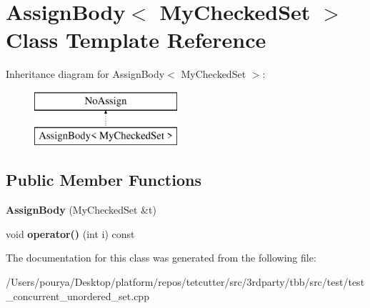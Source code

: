 \hypertarget{classAssignBody_3_01MyCheckedSet_01_4}{}\section{Assign\+Body$<$ My\+Checked\+Set $>$ Class Template Reference}
\label{classAssignBody_3_01MyCheckedSet_01_4}
Inheritance diagram for Assign\+Body$<$ My\+Checked\+Set $>$\+:\begin{figure}[H]
\begin{center}
\leavevmode
\includegraphics[height=2.000000cm]{classAssignBody_3_01MyCheckedSet_01_4}
\end{center}
\end{figure}
\subsection*{Public Member Functions}
\begin{DoxyCompactItemize}
\item 
\hypertarget{classAssignBody_3_01MyCheckedSet_01_4_aeddecfdad057c8d9960df6d590779df5}{}{\bfseries Assign\+Body} (My\+Checked\+Set \&t)\label{classAssignBody_3_01MyCheckedSet_01_4_aeddecfdad057c8d9960df6d590779df5}

\item 
\hypertarget{classAssignBody_3_01MyCheckedSet_01_4_a36d7797f4dcf3cb63c4d7ea882f1d9b3}{}void {\bfseries operator()} (int i) const \label{classAssignBody_3_01MyCheckedSet_01_4_a36d7797f4dcf3cb63c4d7ea882f1d9b3}

\end{DoxyCompactItemize}


The documentation for this class was generated from the following file\+:\begin{DoxyCompactItemize}
\item 
/\+Users/pourya/\+Desktop/platform/repos/tetcutter/src/3rdparty/tbb/src/test/test\+\_\+concurrent\+\_\+unordered\+\_\+set.\+cpp\end{DoxyCompactItemize}
